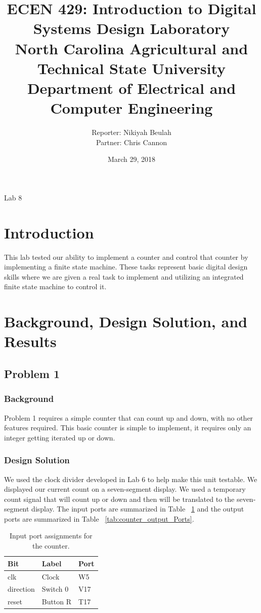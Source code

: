 \documentclass[11pt]{article}
\title {{\titleFont ECEN 429: Introduction to Digital Systems Design Laboratory \\ North Carolina Agricultural and Technical State University \\ Department of Electrical and Computer Engineering}} %
\author{\titleFont Reporter: Nikiyah Beulah \\ \titleFont Partner: Chris Cannon} %
\date{\titleFont March 29, 2018}
\begin{document}
\begin{titlingpage}
\maketitle
\begin{center}
	Lab 8
\end{center}
\end{titlingpage}

\section{Introduction}
This lab tested our ability to implement a counter and control that counter by implementing a finite state machine. These tasks represent basic digital design skills where we are given a real task to implement and utilizing an integrated finite state machine to control it.

\section{Background, Design Solution, and Results}

\subsection{Problem 1 }

\subsubsection{Background}
Problem 1 requires a simple counter that can count up and down, with no other features required. This basic counter is simple to implement, it requires only an integer getting iterated up or down.

\subsubsection{Design Solution}
We used the clock divider developed in Lab 6 to help make this unit testable. We displayed our current count on a seven-segment display. We used a temporary count signal that will count up or down and then will be translated to the seven-segment display. The input ports are summarized in Table ~\ref{tab:counter_input_Ports} and the output ports are summarized in Table ~\ref{tab:counter_output_Ports}.

\begin{table}[H]
\begin{center}
\begin{tabular}{| l | l | l |}
	\hline
	Bit & Label & Port \\ \hline
	clk & Clock & W5 \\ \hline
	direction & Switch 0 & V17 \\ \hline
	reset & Button R & T17 \\ \hline
\end{tabular}
\caption{\label{tab:counter_input_Ports}Input port assignments for  the counter.}
\end{center}
\end{table}
\end{document}
